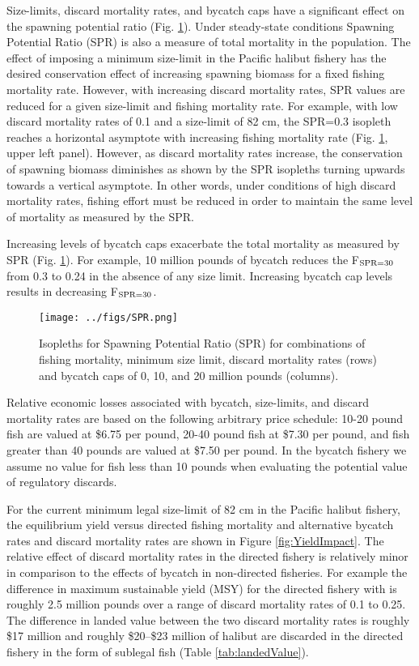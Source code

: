\documentclass[12pt,leqno]{article}
\begin{document}
Size-limits, discard mortality rates, and bycatch caps have a significant effect on the spawning potential ratio (Fig. \ref{fig:SPR}). Under steady-state conditions Spawning Potential Ratio (SPR) is also a measure of total mortality in the population.  The effect of imposing a minimum size-limit in the Pacific halibut fishery has the desired conservation effect of increasing spawning biomass for a fixed fishing mortality rate.  However, with increasing discard mortality rates, SPR values are reduced for a given size-limit and fishing mortality rate.  For example, with low discard mortality rates of 0.1 and a size-limit of 82 cm, the SPR=0.3 isopleth reaches a horizontal asymptote with increasing fishing mortality rate (Fig. \ref{fig:SPR}, upper left panel). However, as discard mortality rates increase, the conservation of spawning biomass diminishes as shown by the SPR isopleths turning upwards towards a vertical asymptote.  In other words, under conditions of high discard mortality rates, fishing effort must be reduced in order to maintain the same level of mortality as measured by the SPR.

Increasing levels of bycatch caps exacerbate the total mortality as measured by SPR (Fig. \ref{fig:SPR}).  For example, 10 million pounds of bycatch reduces the F$_{\textnormal{SPR=30}}$ from 0.3 to 0.24 in the absence of any size limit.  Increasing bycatch cap levels results in decreasing F$_{\textnormal{SPR=30}}$.

\begin{figure}
	\texttt{[image: ../figs/SPR.png]}
	\caption{Isopleths for Spawning Potential Ratio (SPR) for combinations of fishing mortality, minimum size limit, discard mortality rates (rows) and bycatch caps of 0, 10, and 20 million pounds (columns).  }\label{fig:SPR}
\end{figure}

Relative economic losses associated with bycatch, size-limits, and discard mortality rates are based on the following arbitrary price schedule: 10-20 pound fish are valued at \$6.75 per pound, 20-40 pound fish at \$7.30 per pound, and fish greater than 40 pounds are valued at \$7.50 per pound.  In the bycatch fishery we assume no value for fish less than 10 pounds when evaluating the potential value of regulatory discards.

For the current minimum legal size-limit of 82 cm in the Pacific halibut fishery, the equilibrium yield versus directed fishing mortality and alternative bycatch rates and discard mortality rates are shown in Figure \ref{fig:YieldImpact}.  The relative effect of discard mortality rates in the directed fishery is relatively minor in comparison to the effects of bycatch in non-directed fisheries.  For example the difference in maximum sustainable yield (MSY) for the directed fishery with is roughly 2.5 million pounds over a range of discard mortality rates of 0.1 to 0.25.  The difference in landed value between the two discard mortality rates is roughly \$17 million and roughly \$20--\$23 million of halibut are discarded in the directed fishery in the form of sublegal fish  (Table \ref{tab:landedValue}).
\end{document}
